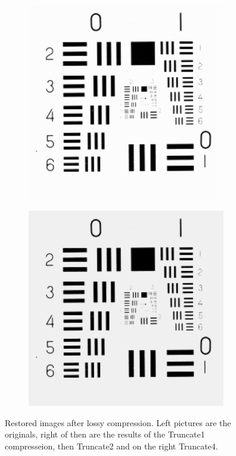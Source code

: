 \begin{figure}
\begin{subfigure}[b]{.23\textwidth}
  \caption{}
  \label{fig:test-images-resolutionchart-truncate1}
\end{subfigure}
\begin{subfigure}[b]{.23\textwidth}
  \centering
  \includegraphics[width=0.95\textwidth]{figures/test-images/truncate2/resolutionchart}
  \caption{}
  \label{fig:test-images-resolutionchart-truncate2}
\end{subfigure}
\begin{subfigure}[b]{.23\textwidth}
  \centering
  \includegraphics[width=0.95\textwidth]{figures/test-images/truncate4/resolutionchart}
  \caption{}
  \label{fig:test-images-resolutionchart-truncate4}
\end{subfigure}
\caption{Restored images after lossy compression. Left pictures are the originals, right of then are the results of the Truncate1 compresseion, then Truncate2 and on the right Truncate4.}
\label{fig:test-images-restored}
\end{figure}



